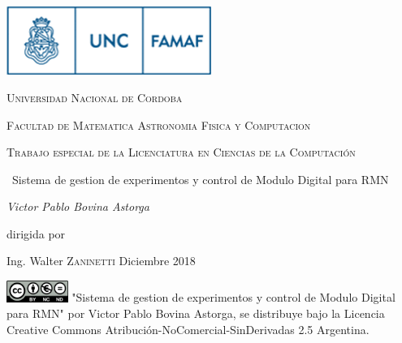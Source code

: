 

\begin{titlepage}
	\centering
	\includegraphics[width=0.50\textwidth]{../figures/famaf-logo.png}\par\vspace{1cm}
    {\scshape\LARGE Universidad Nacional de Cordoba \par}
    {\scshape\LARGE Facultad de Matematica Astronomia Fisica y Computacion \par}
	\vspace{1cm}
	{\scshape\Large Trabajo especial de la Licenciatura en
    Ciencias de la Computación\par}
	\vspace{1.5cm}
	{\huge\ Sistema de gestion de experimentos y control de Modulo Digital para RMN\par}
	\vspace{2cm}
	{\Large\itshape Victor Pablo Bovina Astorga\par}
	\vfill
    dirigida por \par 
    Ing. Walter \textsc{Zaninetti}
    \vfill
    Diciembre 2018
    \vfill

\includegraphics[width=0.15\textwidth]{../figures/cc.png}
\vfill
{\tiny "Sistema de gestion de experimentos y control de Modulo Digital para RMN" por Victor Pablo Bovina Astorga, se distribuye bajo la Licencia Creative Commons
Atribución-NoComercial-SinDerivadas 2.5 Argentina.}
\end{titlepage}
